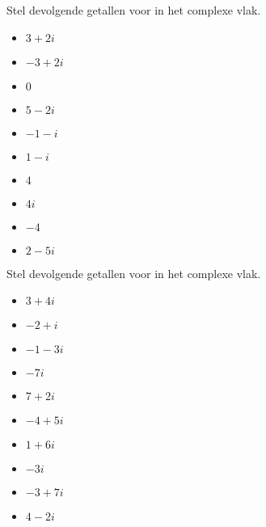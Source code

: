 \documentclass{ximera}
\begin{document}
	\author{Wiskunde Op Maat}



\begin{exercise} Stel devolgende getallen voor in het complexe vlak. 
    \begin{itemize}
        \item \( 3+2i \)
        \item \( -3+2i\)
        \item \( 0    \)
        \item \( 5 - 2i  \)
        \item \( -1-i \)
        \item \( 1-i  \)
        \item \( 4    \)
        \item \( 4i   \)
        \item \( -4   \)
        \item \( 2-5i \)
    \end{itemize}
    
\end{exercise}





\begin{exercise} Stel devolgende getallen voor in het complexe vlak. 
    \begin{itemize}
        \item \( 3 + 4i  \)
        \item \( -2 + i  \)
        \item \( -1 - 3i \)
        \item \( -7i  \)
        \item \( 7 + 2i  \)
        \item \( -4 + 5i \)
        \item \( 1 + 6i  \)
        \item \( -3i   \)
        \item \( -3 + 7i \)
        \item \( 4 - 2i  \)
    \end{itemize}
    
\end{exercise}
\end{document}
